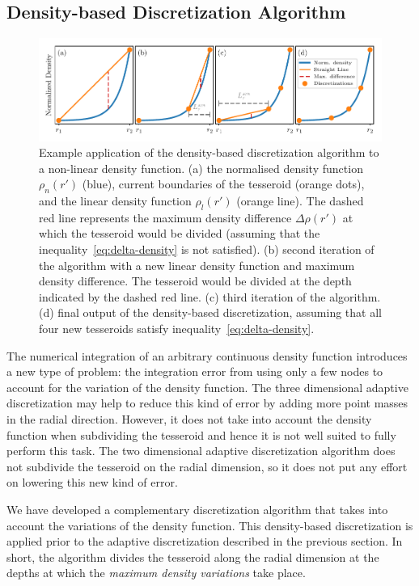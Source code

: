 \documentclass[extra, referee]{gji}
\begin{document}
\subsection{Density-based Discretization Algorithm}

\begin{figure}
\centering
\includegraphics[width=\linewidth]
    {figures/density-based-discretization-algorithm.pdf}
\caption{
    Example application of the density-based discretization algorithm to a non-linear
    density function.
    (a) the normalised density function $\rho_n(r')$ (blue), current boundaries of the
    tesseroid (orange dots), and the linear density function $\rho_l(r')$ (orange line).
    The dashed red line represents the maximum density difference $\Delta \rho (r')$ at
    which the tesseroid would be divided (assuming that the
    inequality~\ref{eq:delta-density} is not satisfied).
    (b) second iteration of the algorithm with a new linear density function and maximum
    density difference. The tesseroid would be divided at the depth indicated by the
    dashed red line.
    (c) third iteration of the algorithm.
    (d) final output of the density-based discretization, assuming that all four new
    tesseroids satisfy inequality~\ref{eq:delta-density}.
}
\label{fig:density-discretization-algorithm}
\end{figure}

The numerical integration of an arbitrary continuous density function introduces a new
type of problem: the integration error from using only a few nodes to account for the
variation of the density function.
The three dimensional adaptive discretization may help
to reduce this kind of error by adding more point masses in the radial direction.
However, it does not take into account the density function when subdividing the
tesseroid and hence it is not well suited to fully perform this task.
The two dimensional adaptive discretization algorithm does not subdivide the tesseroid
on the radial dimension, so it does not put any effort on lowering this new kind of
error.

We have developed a complementary discretization
algorithm that takes into account the variations of the density function.
This density-based discretization is applied prior to the adaptive discretization
described in the previous section.
In short, the algorithm divides the tesseroid along the radial dimension at the
depths at which the \emph{maximum density variations} take place.
\end{document}
